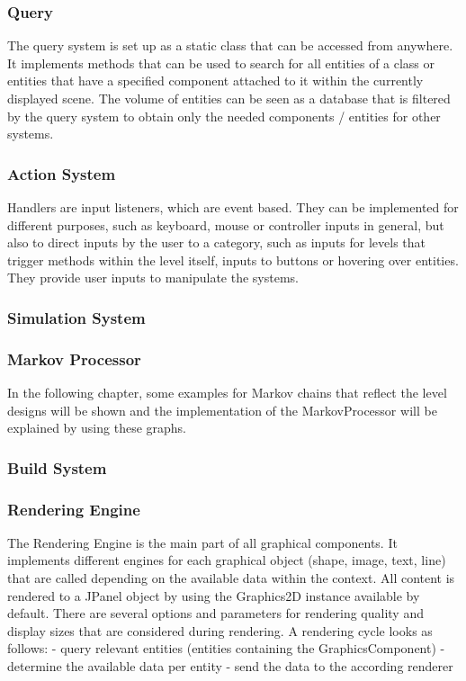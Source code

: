 \subsubsection{Query}\label{subsubsec:query2}
The query system is set up as a static class that can be accessed from anywhere.
It implements methods that can be used to search for all entities of a class or entities that have a specified component
attached to it within the currently displayed scene.
The volume of entities can be seen as a database that is filtered by the query system to obtain only the needed components / entities
for other systems. 

\subsubsection{Action System}\label{subsubsec:action-system}
Handlers are input listeners, which are event based.
They can be implemented for different purposes, such as keyboard, mouse or controller inputs in general, but also to direct inputs by the user
to a category, such as inputs for levels that trigger methods within the level itself, inputs to buttons or hovering over entities.
They provide user inputs to manipulate the systems. 
\subsubsection{Simulation System}\label{subsubsec:simulation-system}

\subsubsection{Markov Processor}\label{subsubsec:example-markov-chains}
In the following chapter, some examples for Markov chains that reflect the level designs will be shown and the implementation of the
MarkovProcessor will be explained by using these graphs.
\subsubsection{Build System}\label{subsubsec:build-system}

\subsubsection{Rendering Engine}\label{subsubsec:graphics-engine}
The Rendering Engine is the main part of all graphical components.
It implements different engines for each graphical object (shape, image, text, line) that are called depending on the available data within the
context.
All content is rendered to a JPanel object by using the Graphics2D instance available by default.
There are several options and parameters for rendering quality and display sizes that are considered during rendering.
A rendering cycle looks as follows:
- query relevant entities (entities containing the GraphicsComponent)
- determine the available data per entity
- send the data to the according renderer
